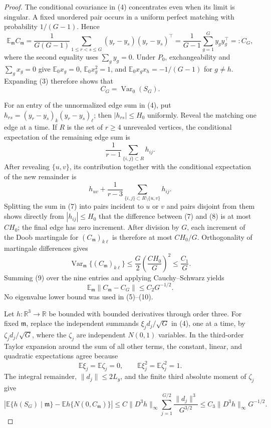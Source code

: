\documentclass{article}
\begin{document}
\begin{proof}
The conditional covariance in (4) concentrates even when its limit is singular.  A fixed unordered pair occurs in a uniform perfect matching with probability \(1/(G-1)\).  Hence
\[
 \mathbb E_{\mathfrak m}C_{\mathfrak m}
 =\frac1{G(G-1)}\sum_{1\leq r<s\leq G}(y_r-y_s)(y_r-y_s)^\top
 =\frac1{G-1}\sum_{g=1}^Gy_gy_g^\top=:C_G,                              \tag{5}
\]
where the second equality uses \(\sum_gy_g=0\).  Under \(P_0\), exchangeability and \(\sum_gx_g=0\) give
\(
 \mathbb E_0x_g=0
\),
\(
 \mathbb E_0x_g^2=1
\), and
\(
 \mathbb E_0x_gx_h=-1/(G-1)
\)
for \(g\ne h\).  Expanding (3) therefore shows that
\[
 C_G=\operatorname{Var}_0(S_G).                                          \tag{6}
\]

For an entry of the unnormalized edge sum in (4), put
\(
 h_{rs}=(y_r-y_s)_k(y_r-y_s)_\ell
\); then \(|h_{rs}|\leq H_0\) uniformly.  Reveal the matching one edge at a time.  If \(R\) is the set of \(r\geq4\) unrevealed vertices, the conditional expectation of the remaining edge sum is
\[
 \frac1{r-1}\sum_{\{i,j\}\subset R}h_{ij}.                              \tag{7}
\]
After revealing \(\{u,v\}\), its contribution together with the conditional expectation of the new remainder is
\[
 h_{uv}+\frac1{r-3}
       \sum_{\{i,j\}\subset R\setminus\{u,v\}}h_{ij}.                  \tag{8}
\]
Splitting the sum in (7) into pairs incident to \(u\) or \(v\) and pairs disjoint from them shows directly from \(|h_{ij}|\leq H_0\) that the difference between (7) and (8) is at most \(C H_0\); the final edge has zero increment.  After division by \(G\), each increment of the Doob martingale for \((C_{\mathfrak m})_{k\ell}\) is therefore at most \(C H_0/G\).  Orthogonality of martingale differences gives
\[
 \operatorname{Var}_{\mathfrak m}\{(C_{\mathfrak m})_{k\ell}\}
 \leq \frac G2\left(\frac{C H_0}{G}\right)^2
 \leq \frac{C_1}{G}.                                                     \tag{9}
\]
Summing (9) over the nine entries and applying Cauchy--Schwarz yields
\[
 \mathbb E_{\mathfrak m}\|C_{\mathfrak m}-C_G\|\leq C_2G^{-1/2}.       \tag{10}
\]
No eigenvalue lower bound was used in (5)--(10).

Let \(h:\mathbb R^3\to\mathbb R\) be bounded with bounded derivatives through order three.  For fixed \(\mathfrak m\), replace the independent summands \(\xi_jd_j/\sqrt G\) in (4), one at a time, by \(\zeta_jd_j/\sqrt G\), where the \(\zeta_j\) are independent \(N(0,1)\) variables.  In the third-order Taylor expansion around the sum of all other terms, the constant, linear, and quadratic expectations agree because
\[
 \mathbb E\xi_j=\mathbb E\zeta_j=0,
 \qquad
 \mathbb E\xi_j^2=\mathbb E\zeta_j^2=1.                                \tag{11}
\]
The integral remainder, \(\|d_j\|\leq2L_y\), and the finite third absolute moment of \(\zeta_j\) give
\[
 \left|\mathbb E\{h(S_G)\mid\mathfrak m\}
       -\mathbb Eh\{N(0,C_{\mathfrak m})\}\right|
 \leq C\|D^3h\|_\infty
       \sum_{j=1}^{G/2}\frac{\|d_j\|^3}{G^{3/2}}
 \leq C_3\|D^3h\|_\infty G^{-1/2}.                                    \tag{12}
\]


\end{proof}
\end{document}
